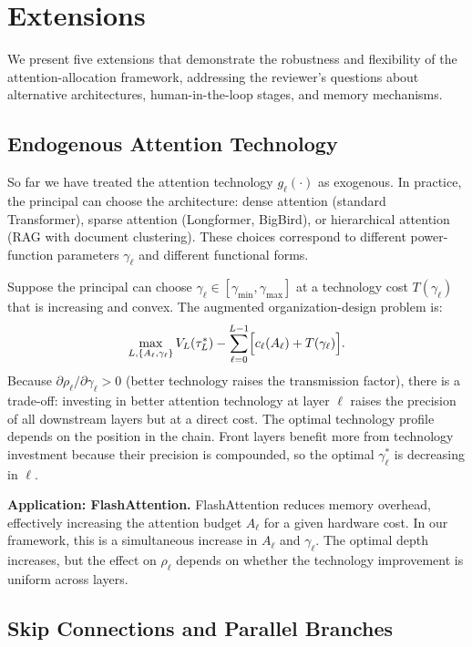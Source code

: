 \section{Extensions}
\label{sec:extensions}

We present five extensions that demonstrate the robustness and flexibility of the attention-allocation framework, addressing the reviewer's questions about alternative architectures, human-in-the-loop stages, and memory mechanisms.

\subsection{Endogenous Attention Technology}
\label{subsec:endogenous_tech}

So far we have treated the attention technology $g_\ell(\cdot)$ as exogenous. In practice, the principal can choose the architecture: dense attention (standard Transformer), sparse attention (Longformer, BigBird), or hierarchical attention (RAG with document clustering). These choices correspond to different power-function parameters $\gamma_\ell$ and different functional forms.

Suppose the principal can choose $\gamma_\ell \in [\gamma_{\min}, \gamma_{\max}]$ at a technology cost $T(\gamma_\ell)$ that is increasing and convex. The augmented organization-design problem is:
\begin{equation}\label{eq:endogenous_tech}
\max_{L, \{A_\ell, \gamma_\ell\}} V_L(\tau^*_L) - \sum_{\ell=0}^{L-1} \Bigl[c_\ell(A_\ell) + T(\gamma_\ell)\Bigr].
\end{equation}
Because $\partial \rho_\ell / \partial \gamma_\ell > 0$ (better technology raises the transmission factor), there is a trade-off: investing in better attention technology at layer $\ell$ raises the precision of all downstream layers but at a direct cost. The optimal technology profile depends on the position in the chain. Front layers benefit more from technology investment because their precision is compounded, so the optimal $\gamma^*_\ell$ is decreasing in $\ell$.

\textbf{Application: FlashAttention.} FlashAttention reduces memory overhead, effectively increasing the attention budget $A_\ell$ for a given hardware cost. In our framework, this is a simultaneous increase in $A_\ell$ and $\gamma_\ell$. The optimal depth increases, but the effect on $\rho_\ell$ depends on whether the technology improvement is uniform across layers.

\subsection{Skip Connections and Parallel Branches}
\label{subsec:skip_parallel}

